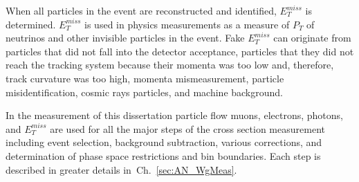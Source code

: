 When all particles in the event are reconstructed and identified, $E_T^{miss}$ is determined. $E_T^{miss}$ is used in physics measurements as a measure of $P_T$ of neutrinos and other invisible particles in the event. Fake $E_T^{miss}$ can originate from particles that did not fall into the detector acceptance, particles that they did not reach the tracking system because their momenta was too low and, therefore, track curvature was too high, momenta mismeasurement, particle misidentification, cosmic rays particles, and machine background.

In the measurement of this dissertation particle flow muons, electrons, photons, and $E_T^{miss}$ are used for all the major steps of the cross section measurement including event selection, background subtraction, various corrections, and determination of phase space restrictions and bin boundaries. Each step is described in greater details in~Ch.~\ref{sec:AN_WgMeas}. 

